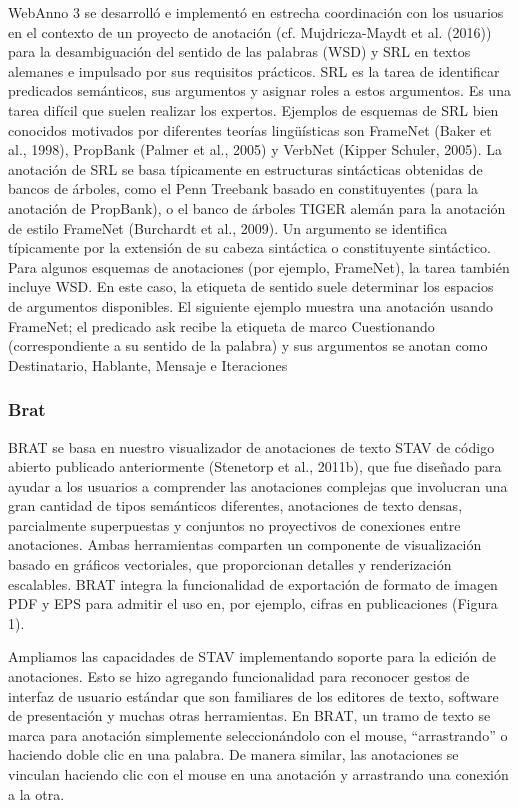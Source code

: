 WebAnno 3 se desarrolló e implementó en estrecha coordinación con los usuarios en el contexto de un proyecto de anotación (cf. Mujdricza-Maydt et al. (2016)) para la desambiguación del sentido de las palabras (WSD) y SRL en textos alemanes e impulsado por sus requisitos prácticos. SRL es la tarea de identificar predicados semánticos, sus argumentos y asignar roles a estos argumentos. Es una tarea difícil que suelen realizar los expertos.
Ejemplos de esquemas de SRL bien conocidos motivados por diferentes teorías lingüísticas son FrameNet (Baker et al., 1998), PropBank (Palmer et al., 2005) y VerbNet (Kipper Schuler, 2005). La anotación de SRL se basa típicamente en estructuras sintácticas obtenidas de bancos de árboles, como el Penn Treebank basado en constituyentes (para la anotación de PropBank), o el banco de árboles TIGER alemán para la anotación de estilo FrameNet (Burchardt et al., 2009). Un argumento se identifica típicamente por la extensión de su cabeza sintáctica o constituyente sintáctico. Para algunos esquemas de anotaciones (por ejemplo, FrameNet), la tarea también incluye WSD. En este caso, la etiqueta de sentido suele determinar los espacios de argumentos disponibles. El siguiente ejemplo muestra una anotación usando FrameNet; el predicado ask recibe la etiqueta de marco Cuestionando (correspondiente a su sentido de la palabra) y sus argumentos se anotan como Destinatario, Hablante, Mensaje e Iteraciones

\subsubsection*{Brat}

BRAT se basa en nuestro visualizador de anotaciones de texto STAV de código abierto publicado anteriormente (Stenetorp et al., 2011b), que fue diseñado para ayudar a los usuarios a comprender las anotaciones complejas que involucran una gran cantidad de tipos semánticos diferentes, anotaciones de texto densas, parcialmente superpuestas y conjuntos no proyectivos de conexiones entre anotaciones. Ambas herramientas comparten un componente de visualización basado en gráficos vectoriales, que proporcionan detalles y renderización escalables. BRAT integra la funcionalidad de exportación de formato de imagen PDF y EPS para admitir el uso en, por ejemplo, cifras en publicaciones (Figura 1).

Ampliamos las capacidades de STAV implementando soporte para la edición de anotaciones. Esto se hizo agregando funcionalidad para reconocer gestos de interfaz de usuario estándar que son familiares de los editores de texto, software de presentación y muchas otras herramientas.
En BRAT, un tramo de texto se marca para anotación simplemente seleccionándolo con el mouse, “arrastrando” o haciendo doble clic en una palabra. De manera similar, las anotaciones se vinculan haciendo clic con el mouse en una anotación y arrastrando una conexión a la otra.

